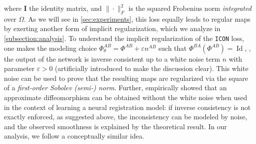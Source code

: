 where $\mathbf{I}$ the identity matrix, and $\|\cdot\|_F^2$ is the squared Frobenius norm \emph{integrated} over $\Omega$. As we will see in \ref{sec:experiments}, this loss equally leads to regular maps by exerting another form of implicit regularization, which we analyze in \ref{subsection:analysis}.  To understand the implicit regularization of the \texttt{ICON} loss, one makes the modeling choice $\Phi^{AB}_{\theta} = \Phi^{AB} + \varepsilon n^{AB}$ such that $\Phi^{BA}(\Phi^{AB}) = \operatorname{Id}$, \ie, the output of the network is inverse consistent up to a white noise term $n$ with parameter $\varepsilon >0$ (artificially introduced to make the discussion clear). This white noise can be used to prove that the resulting maps are regularized via the square of a \emph{first-order Sobolev (semi-) norm}. Further, \cite{greer2021icon} empirically showed that an approximate diffeomorphism can be obtained without the white noise when used in the context of learning a neural registration model: if inverse consistency is not exactly enforced,  as suggested above, the inconsistency can be modeled by noise, and the observed smoothness is explained by the theoretical result. In our analysis, we follow a conceptually similar idea.

\vspace{-0.15cm}

